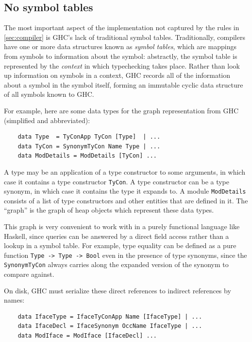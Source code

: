 \subsection{No symbol tables}
\label{sec:no-symbol-tables}

The most important aspect of the implementation not captured by
the rules in \cref{sec:compiler} is GHC's lack of traditional
symbol tables.
Traditionally, compilers have one or more data structures known as
\emph{symbol tables}, which are mappings from symbols to information
about the symbol: abstractly, the symbol table is represented by
the \emph{context} in which typechecking takes place.
Rather than look up information on symbols in a
context, GHC records all of the information about a symbol in
the symbol itself, forming an immutable cyclic data structure of
all symbols known to GHC\@.

For example, here are
some data types for the graph representation from GHC (simplified
and abbreviated):

\begin{lstlisting}
    data Type  = TyConApp TyCon [Type]  | ...
    data TyCon = SynonymTyCon Name Type | ...
    data ModDetails = ModDetails [TyCon] ...
\end{lstlisting}
%
A type may be an application of a type constructor to some arguments, in which
case it contains a type constructor \verb|TyCon|.  A type constructor
can be a type synonym, in which case it contains the type it expands
to.  A module \verb|ModDetails| consists of a list of type constructors
and other entities that are defined in it.  The ``graph'' is the graph of
heap objects which represent these data types.

This graph is very convenient to work with in a purely functional
language like Haskell, since queries can be answered by a direct field
access rather than a lookup in a symbol table.  For example, type
equality can be defined as a pure function \verb|Type -> Type -> Bool|
even in the presence of type synonyms, since the \verb|SynonymTyCon|
always carries along the expanded version of the synonym to compare
against.

On disk, GHC must serialize these direct references to indirect references
by names:

\begin{lstlisting}
    data IfaceType = IfaceTyConApp Name [IfaceType] | ...
    data IfaceDecl = IfaceSynonym OccName IfaceType | ...
    data ModIface = ModIface [IfaceDecl] ...
\end{lstlisting}

